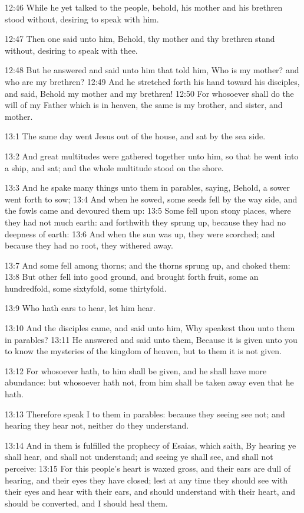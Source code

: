 12:46 While he yet talked to the people, behold, his mother and his brethren stood without, desiring to speak with him.

12:47 Then one said unto him, Behold, thy mother and thy brethren stand without, desiring to speak with thee.

12:48 But he answered and said unto him that told him, Who is my mother?  and who are my brethren?  12:49 And he stretched forth his hand toward his disciples, and said, Behold my mother and my brethren!  12:50 For whosoever shall do the will of my Father which is in heaven, the same is my brother, and sister, and mother.

13:1 The same day went Jesus out of the house, and sat by the sea side.

13:2 And great multitudes were gathered together unto him, so that he went into a ship, and sat; and the whole multitude stood on the shore.

13:3 And he spake many things unto them in parables, saying, Behold, a sower went forth to sow; 13:4 And when he sowed, some seeds fell by the way side, and the fowls came and devoured them up: 13:5 Some fell upon stony places, where they had not much earth: and forthwith they sprung up, because they had no deepness of earth: 13:6 And when the sun was up, they were scorched; and because they had no root, they withered away.

13:7 And some fell among thorns; and the thorns sprung up, and choked them: 13:8 But other fell into good ground, and brought forth fruit, some an hundredfold, some sixtyfold, some thirtyfold.

13:9 Who hath ears to hear, let him hear.

13:10 And the disciples came, and said unto him, Why speakest thou unto them in parables?  13:11 He answered and said unto them, Because it is given unto you to know the mysteries of the kingdom of heaven, but to them it is not given.

13:12 For whosoever hath, to him shall be given, and he shall have more abundance: but whosoever hath not, from him shall be taken away even that he hath.

13:13 Therefore speak I to them in parables: because they seeing see not; and hearing they hear not, neither do they understand.

13:14 And in them is fulfilled the prophecy of Esaias, which saith, By hearing ye shall hear, and shall not understand; and seeing ye shall see, and shall not perceive: 13:15 For this people's heart is waxed gross, and their ears are dull of hearing, and their eyes they have closed; lest at any time they should see with their eyes and hear with their ears, and should understand with their heart, and should be converted, and I should heal them.

